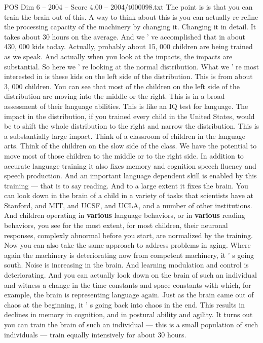 \begin{textsample}{POS Dim 6 – 2004 – Score 4.00 – 2004/t000098.txt}
The point is is that you can train the brain out of this.
A way to think about this is you can actually re-refine the processing capacity of the machinery by changing it.
Changing it in detail.
It takes about 30 hours on the average.
And we ' ve accomplished that in about 430, 000 kids today.
Actually, probably about 15, 000 children are being trained as we speak.
And actually when you look at the impacts, the impacts are substantial.
So here we ' re looking at the normal distribution.
What we ' re most interested in is these kids on the left side of the distribution.
This is from about 3, 000 children.
You can see that most of the children on the left side of the distribution are moving into the middle or the right.
This is in a broad assessment of their language abilities.
This is like an IQ test for language.
The impact in the distribution, if you trained every child in the United States, would be to shift the whole distribution to the right and narrow the distribution.
This is a substantially large impact.
Think of a classroom of children in the language arts.
Think of the children on the slow side of the class.
We have the potential to move most of those children to the middle or to the right side.
In addition to accurate language training it also fixes memory and cognition speech fluency and speech production.
And an important language dependent skill is enabled by this training — that is to say reading.
And to a large extent it fixes the brain.
You can look down in the brain of a child in a variety of tasks that scientists have at Stanford, and MIT, and UCSF, and UCLA, and a number of other institutions.
And children operating in \textbf{various} language behaviors, or in \textbf{various} reading behaviors, you see for the most extent, for most children, their neuronal responses, complexly abnormal before you start, are normalized by the training.
Now you can also take the same approach to address problems in aging.
Where again the machinery is deteriorating now from competent machinery, it ' s going south.
Noise is increasing in the brain.
And learning modulation and control is deteriorating.
And you can actually look down on the brain of such an individual and witness a change in the time constants and space constants with which, for example, the brain is representing language again.
Just as the brain came out of chaos at the beginning, it ' s going back into chaos in the end.
This results in declines in memory in cognition, and in postural ability and agility.
It turns out you can train the brain of such an individual — this is a small population of such individuals — train equally intensively for about 30 hours.

\end{textsample}
